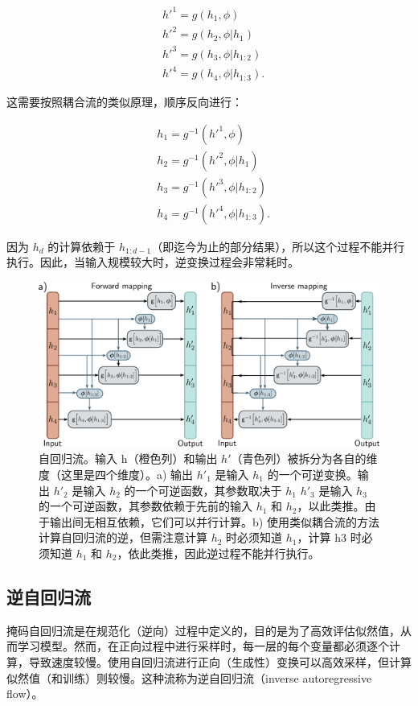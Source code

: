 \begin{align}
&h'^1 = g(h_1, \phi) \\
&h'^2 = g(h_2, \phi|h_1) \\
&h'^3 = g(h_3, \phi|h_{1:2}) \\
&h'^4 = g(h_4, \phi|h_{1:3}) .  
\end{align}


这需要按照耦合流的类似原理，顺序反向进行：


\begin{align}
&h_1 = g^{-1}(h'^1, \phi) \\
&h_2 = g^{-1}(h'^2, \phi|h_1) \\
&h_3 = g^{-1}(h'^3, \phi|h_{1:2}) \\
&h_4 = g^{-1}(h'^4, \phi|h_{1:3}) . 
\end{align} 


因为 \(h_d\) 的计算依赖于 \(h_{1:d-1}\)（即迄今为止的部分结果），所以这个过程不能并行执行。因此，当输入规模较大时，逆变换过程会非常耗时。

\begin{figure}[ht!]
\centering
\includegraphics[width=0.7\linewidth]{png/chapter16/FlowAutoregressive.png}
\caption{自回归流。输入 h（橙色列）和输出 \(h \prime\)（青色列）被拆分为各自的维度（这里是四个维度）。a) 输出 \(h \prime _1\) 是输入 \(h_1\) 的一个可逆变换。输出 \(h \prime_2\) 是输入 \(h_2\) 的一个可逆函数，其参数取决于 \(h_1\) \(h\prime_3\) 是输入 \(h_3\) 的一个可逆函数，其参数依赖于先前的输入 \(h_1\) 和 \(h_2\)，以此类推。由于输出间无相互依赖，它们可以并行计算。b) 使用类似耦合流的方法计算自回归流的逆，但需注意计算 \(h_2\) 时必须知道 \(h_1\)，计算 h3 时必须知道 \(h_1\) 和 \(h_2\)，依此类推，因此逆过程不能并行执行。}
\end{figure}



\subsection{逆自回归流}
掩码自回归流是在规范化（逆向）过程中定义的，目的是为了高效评估似然值，从而学习模型。然而，在正向过程中进行采样时，每一层的每个变量都必须逐个计算，导致速度较慢。使用自回归流进行正向（生成性）变换可以高效采样，但计算似然值（和训练）则较慢。这种流称为逆自回归流（inverse autoregressive flow）。

